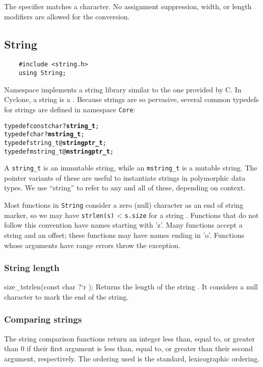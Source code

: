The \code{\%} specifier matches a \code{\%} character.  No assignment
suppression, width, or length modifiers are allowed for the \code{\%}
conversion.

\subsection{String}

\begin{verbatim}
    #include <string.h>
    using String;
\end{verbatim}

Namespace  implements a string library similar to the one
provided by C\@.  In Cyclone, a string is a .  Because
strings are so pervasive, several common typedefs for strings are
defined in namespace \texttt{Core}:
\begin{alltt}
    typedef const char ?\textbf{string_t};
    typedef char ?\textbf{mstring_t};
    typedef string_t @\textbf{stringptr_t};
    typedef mstring_t @\textbf{mstringptr_t};
\end{alltt}
A \texttt{string_t} is an immutable string, while an
\texttt{mstring_t} is a mutable string.  The pointer variants of these
are useful to instantiate strings in polymorphic data types.  We use
``string'' to refer to any and all of these, depending on context.

Most functions in \texttt{String} consider a zero (null) character as
an end of string marker, so we may have \texttt{strlen(s)} <
\texttt{s.size} for a string .  Functions that do not follow
this convention have names starting with 'z'.  Many functions accept a
string and an offset; these functions may have names ending in 'o'.
Functions whose arguments have range errors throw the
 exception.

\subsubsection*{String length}
\begin{defun2}{size_t}{strlen}{(const char {?}`r );}
  Returns the length of the string .  It considers a null
  character to mark the end of the string.
\end{defun2}

\subsubsection*{Comparing strings}
The string comparison functions return an integer less than, equal to,
or greater than 0 if their first argument is less than, equal to, or
greater than their second argument, respectively.  The ordering used
is the standard, lexicographic ordering.

